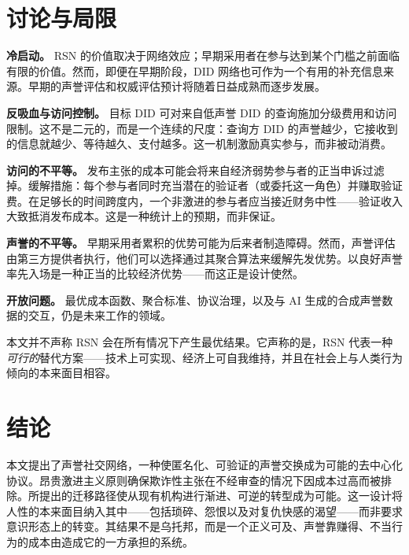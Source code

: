 \documentclass[11pt,a4paper,twocolumn]{article}
\begin{document}
\section{讨论与局限}

\textbf{冷启动。} RSN 的价值取决于网络效应；早期采用者在参与达到某个门槛之前面临有限的价值。然而，即便在早期阶段，DID 网络也可作为一个有用的补充信息来源。早期的声誉评估和权威评估预计将随着日益成熟而逐步发展。

\textbf{反吸血与访问控制。} 目标 DID 可对来自低声誉 DID 的查询施加分级费用和访问限制。这不是二元的，而是一个连续的尺度：查询方 DID 的声誉越少，它接收到的信息就越少、等待越久、支付越多。这一机制激励真实参与，而非被动消费。

\textbf{访问的不平等。} 发布主张的成本可能会将来自经济弱势参与者的正当申诉过滤掉。缓解措施：每个参与者同时充当潜在的验证者（或委托这一角色）并赚取验证费。在足够长的时间跨度内，一个非激进的参与者应当接近财务中性——验证收入大致抵消发布成本。这是一种统计上的预期，而非保证。

\textbf{声誉的不平等。} 早期采用者累积的优势可能为后来者制造障碍。然而，声誉评估由第三方提供者执行，他们可以选择通过其聚合算法来缓解先发优势。以良好声誉率先入场是一种正当的比较经济优势——而这正是设计使然。

\textbf{开放问题。} 最优成本函数、聚合标准、协议治理，以及与 AI 生成的合成声誉数据的交互，仍是未来工作的领域。

本文并不声称 RSN 会在所有情况下产生最优结果。它声称的是，RSN 代表一种\emph{可行的}替代方案——技术上可实现、经济上可自我维持，并且在社会上与人类行为倾向的本来面目相容。

\section{结论}

本文提出了声誉社交网络，一种使匿名化、可验证的声誉交换成为可能的去中心化协议。昂贵激进主义原则确保欺诈性主张在不经审查的情况下因成本过高而被排除。所提出的迁移路径使从现有机构进行渐进、可逆的转型成为可能。这一设计将人性的本来面目纳入其中——包括琐碎、怨恨以及对复仇快感的渴望——而非要求意识形态上的转变。其结果不是乌托邦，而是一个正义可及、声誉靠赚得、不当行为的成本由造成它的一方承担的系统。


\end{document}
